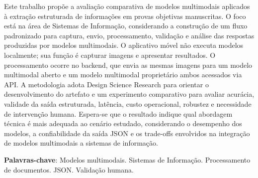 \begin{resumo}

Este trabalho propõe a avaliação comparativa de modelos multimodais aplicados à extração estruturada de informações em provas objetivas manuscritas. O foco está na área de Sistemas de Informação, considerando a construção de um fluxo padronizado para captura, envio, processamento, validação e análise das respostas produzidas por modelos multimodais. O aplicativo móvel não executa modelos localmente; sua função é capturar imagens e apresentar resultados. O processamento ocorre no backend, que envia as mesmas imagens para um modelo multimodal aberto e um modelo multimodal proprietário ambos acessados via API. A metodologia adota Design Science Research para orientar o desenvolvimento do artefato e um experimento comparativo para avaliar acurácia, validade da saída estruturada, latência, custo operacional, robustez e necessidade de intervenção humana. Espera-se que o resultado indique qual abordagem técnica é mais adequada ao cenário estudado, considerando o desempenho dos modelos, a confiabilidade da saída JSON e os trade-offs envolvidos na integração de modelos multimodais a sistemas de informação.

\vspace{\onelineskip}

\noindent
\textbf{Palavras-chave}: Modelos multimodais. Sistemas de Informação. Processamento de documentos. JSON. Validação humana.

\end{resumo}
